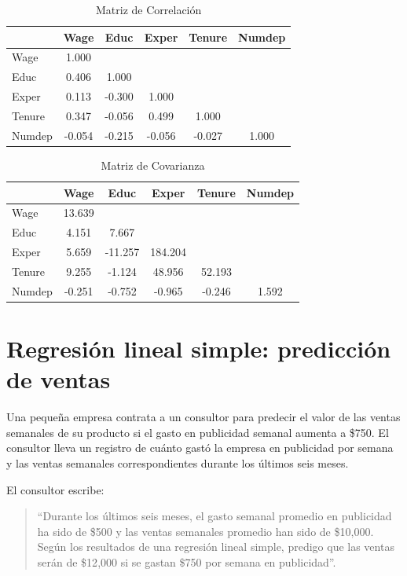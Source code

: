 \documentclass[12pt]{article}
\begin{document}
\begin{table}[h!]
\centering
\caption{Matriz de Correlación}
\label{tab:correlation_matrix}
\begin{tabular}{lccccc}
\toprule
 & Wage & Educ & Exper & Tenure & Numdep \\
\midrule
Wage & 1.000 & & & & \\
Educ & 0.406 & 1.000 & & & \\
Exper & 0.113 & -0.300 & 1.000 & & \\
Tenure & 0.347 & -0.056 & 0.499 & 1.000 & \\
Numdep & -0.054 & -0.215 & -0.056 & -0.027 & 1.000 \\
\bottomrule
\end{tabular}
\end{table}

\begin{table}[h!]
\centering
\caption{Matriz de Covarianza}
\label{tab:covariance_matrix}
\begin{tabular}{lccccc}
\toprule
 & Wage & Educ & Exper & Tenure & Numdep \\
\midrule
Wage & 13.639 & & & & \\
Educ & 4.151 & 7.667 & & & \\
Exper & 5.659 & -11.257 & 184.204 & & \\
Tenure & 9.255 & -1.124 & 48.956 & 52.193 & \\
Numdep & -0.251 & -0.752 & -0.965 & -0.246 & 1.592 \\
\bottomrule
\end{tabular}
\end{table}

\section{Regresión lineal simple: predicción de ventas}

Una pequeña empresa contrata a un consultor para predecir el valor de las ventas semanales de su producto si el gasto en publicidad semanal aumenta a \$750. 
El consultor lleva un registro de cuánto gastó la empresa en publicidad por semana y las ventas semanales correspondientes durante los últimos seis meses. 

El consultor escribe: 
\begin{quote}
``Durante los últimos seis meses, el gasto semanal promedio en publicidad ha sido de \$500 y las ventas semanales promedio han sido de \$10{,}000. 
Según los resultados de una regresión lineal simple, predigo que las ventas serán de \$12{,}000 si se gastan \$750 por semana en publicidad''.
\end{quote}
\end{document}
